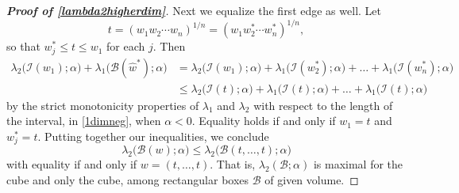\documentclass[12pt,reqno]{amsart}
\theoremstyle{definition}
\begin{document}
\begin{proof}[\bf Proof of \autoref{lambda2higherdim}]
Next we equalize the first edge as well. Let  
\[
t = (w_1 w_2 \cdots w_n)^{1/n} = (w_1 w_2^* \cdots w_n^*)^{1/n} ,
\]
so that $w_j^* \leq t \leq w_1$ for each $j$. Then 
%
\begin{align*}
\lambda_2\big( \mathcal{I}(w_1) ; \alpha \big) + \lambda_1\big( \mathcal{B}(\widehat{w}^*) ; \alpha \big) 
& = \lambda_2\big( \mathcal{I}(w_1) ; \alpha \big) + \lambda_1\big( \mathcal{I}(w_2^*) ; \alpha \big) + \dots + \lambda_1\big( \mathcal{I}(w_n^*) ; \alpha \big) \\
& \leq \lambda_2\big( \mathcal{I}(t) ; \alpha \big) + \lambda_1\big( \mathcal{I}(t) ; \alpha \big) + \dots + \lambda_1\big( \mathcal{I}(t) ; \alpha \big)
\end{align*}
%
by the strict monotonicity properties of $\lambda_1$ and $\lambda_2$ with respect to the length of the interval, in \autoref{1dimneg}, when $\alpha < 0$. Equality holds if and only if $w_1=t$ and $w_j^*=t$. Putting together our inequalities, we conclude  
\[
\lambda_2\big( \mathcal{B}(w) ; \alpha \big) \leq \lambda_2\big( \mathcal{B}(t,\dots,t) ; \alpha \big) 
\]
with equality if and only if $w=(t,\dots,t)$. That is, $\lambda_2(\mathcal{B};\alpha)$ is maximal for the cube and only the cube, among rectangular boxes $\mathcal{B}$ of given volume. 
\end{proof}
%
\end{document}
